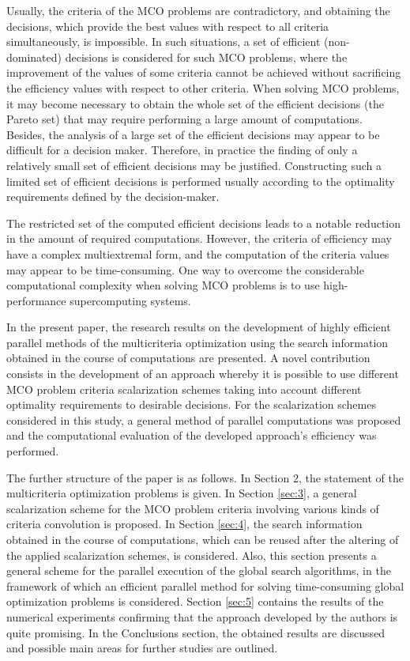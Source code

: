 \documentclass[runningheads]{llncs}
\begin{document}
Usually, the criteria of the MCO problems are contradictory, and obtaining the decisions, which provide the best values with respect to all criteria simultaneously, is impossible. In such situations, a set of efficient (non-dominated) decisions is considered for such MCO problems,  where the improvement of
the values of some criteria cannot be achieved without sacrificing the efficiency values with respect to other criteria. When solving MCO problems, it may become necessary to obtain the whole set of the efficient decisions (the Pareto set) that may require performing a large amount of computations. Besides, the analysis of a large set of the efficient decisions may appear to be
difficult for a decision maker. Therefore, in practice the finding of only a relatively small set of efficient decisions may be justified. Constructing such a limited set of efficient decisions is performed usually according to the optimality requirements defined by the decision-maker.

The restricted set of the computed efficient decisions leads to a notable reduction in the amount of required computations. However, the criteria of efficiency may have a complex multiextremal form, and the computation of the criteria values may appear to be time-consuming. One way to overcome the considerable computational complexity when solving MCO problems is to use high-performance supercomputing systems.

In the present paper, the research results on the development of highly efficient parallel methods of the multicriteria optimization using the search information obtained in the course of computations \cite{c6,c7,c8,c9,c16} are presented. A novel contribution consists in the development of an approach whereby it is possible to use different MCO problem criteria scalarization schemes taking into account different optimality requirements to desirable decisions. For the scalarization schemes considered in this study, a general method of parallel computations was proposed and the computational evaluation of the developed approach's efficiency was performed.

The further structure of the paper is as follows. In Section 2, the statement of the multicriteria optimization problems is given. In Section \ref{sec:3}, a general scalarization scheme for the MCO problem criteria involving various kinds of criteria convolution is proposed. In Section \ref{sec:4}, the search information obtained in the course of computations, which can be reused after the altering of the applied scalarization schemes, is considered. Also, this section presents a general scheme for the parallel execution of the global search algorithms, in the framework of which an efficient parallel method for solving time-consuming global optimization problems is considered. Section \ref{sec:5} contains the results of the numerical experiments confirming that the approach developed by the authors is quite promising. In the Conclusions section, the obtained results are discussed and possible main areas for further studies are outlined.
\end{document}
